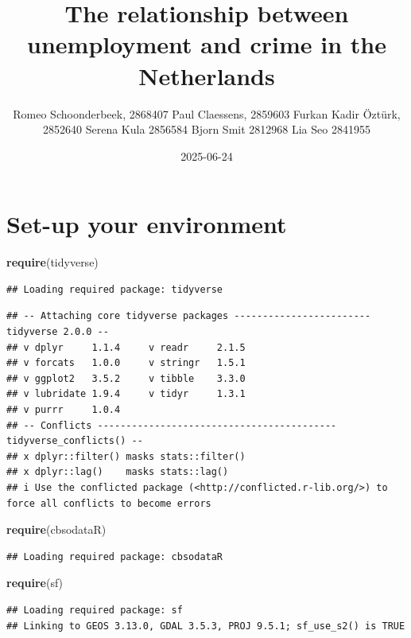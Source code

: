 \documentclass[
]{article}
\title{The relationship between unemployment and crime in the
Netherlands}
\author{Romeo Schoonderbeek, 2868407 Paul Claessens, 2859603 Furkan
Kadir Öztürk, 2852640 Serena Kula 2856584 Bjorn Smit 2812968 Lia Seo
2841955}
\date{2025-06-24}
\newenvironment{Shaded}{\begin{snugshade}}{\end{snugshade}}
\newcommand{\FunctionTok}[1]{\textcolor[rgb]{0.13,0.29,0.53}{\textbf{#1}}}
\newcommand{\NormalTok}[1]{#1}
\begin{document}
\maketitle

\section{Set-up your environment}\label{set-up-your-environment}

\begin{Shaded}
\begin{Highlighting}[]
\FunctionTok{require}\NormalTok{(tidyverse)}
\end{Highlighting}
\end{Shaded}

\begin{verbatim}
## Loading required package: tidyverse
\end{verbatim}

\begin{verbatim}
## -- Attaching core tidyverse packages ------------------------ tidyverse 2.0.0 --
## v dplyr     1.1.4     v readr     2.1.5
## v forcats   1.0.0     v stringr   1.5.1
## v ggplot2   3.5.2     v tibble    3.3.0
## v lubridate 1.9.4     v tidyr     1.3.1
## v purrr     1.0.4     
## -- Conflicts ------------------------------------------ tidyverse_conflicts() --
## x dplyr::filter() masks stats::filter()
## x dplyr::lag()    masks stats::lag()
## i Use the conflicted package (<http://conflicted.r-lib.org/>) to force all conflicts to become errors
\end{verbatim}

\begin{Shaded}
\begin{Highlighting}[]
\FunctionTok{require}\NormalTok{(cbsodataR)}
\end{Highlighting}
\end{Shaded}

\begin{verbatim}
## Loading required package: cbsodataR
\end{verbatim}

\begin{Shaded}
\begin{Highlighting}[]
\FunctionTok{require}\NormalTok{(sf)}
\end{Highlighting}
\end{Shaded}

\begin{verbatim}
## Loading required package: sf
## Linking to GEOS 3.13.0, GDAL 3.5.3, PROJ 9.5.1; sf_use_s2() is TRUE
\end{verbatim}
\end{document}
